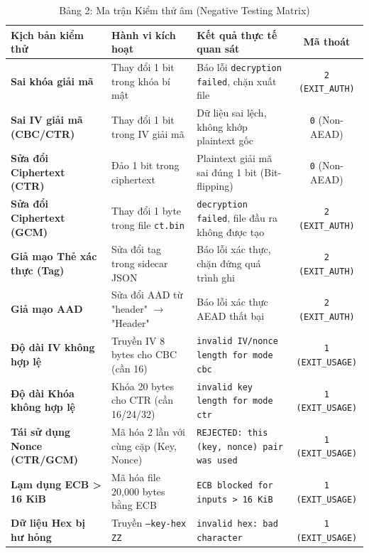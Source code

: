 \documentclass[12pt, a4paper]{report}
\begin{document}
\begin{table}[H]
\centering
\small
\caption{Bảng 2: Ma trận Kiểm thử âm (Negative Testing Matrix)}
\label{tab:negative}
\begin{tabular}{p{4.2cm} p{3.8cm} p{4.2cm} c}
\toprule
\textbf{Kịch bản kiểm thử} & \textbf{Hành vi kích hoạt} & \textbf{Kết quả thực tế quan sát} & \textbf{Mã thoát} \\
\midrule
\textbf{Sai khóa giải mã} & Thay đổi 1 bit trong khóa bí mật & Báo lỗi \texttt{decryption failed}, chặn xuất file & \texttt{2 (EXIT\_AUTH)} \\
\textbf{Sai IV giải mã (CBC/CTR)} & Thay đổi 1 bit trong IV giải mã & Dữ liệu sai lệch, không khớp plaintext gốc & \texttt{0} (Non-AEAD) \\
\textbf{Sửa đổi Ciphertext (CTR)} & Đảo 1 bit trong ciphertext & Plaintext giải mã sai đúng 1 bit (Bit-flipping) & \texttt{0} (Non-AEAD) \\
\textbf{Sửa đổi Ciphertext (GCM)} & Thay đổi 1 byte trong file \texttt{ct.bin} & \texttt{decryption failed}, file đầu ra không được tạo & \texttt{2 (EXIT\_AUTH)} \\
\textbf{Giả mạo Thẻ xác thực (Tag)} & Sửa đổi tag trong sidecar JSON & Báo lỗi xác thực, chặn đứng quá trình ghi & \texttt{2 (EXIT\_AUTH)} \\
\textbf{Giả mạo AAD} & Sửa đổi AAD từ "header" $\rightarrow$ "Header" & Báo lỗi xác thực AEAD thất bại & \texttt{2 (EXIT\_AUTH)} \\
\textbf{Độ dài IV không hợp lệ} & Truyền IV 8 bytes cho CBC (cần 16) & \texttt{invalid IV/nonce length for mode cbc} & \texttt{1 (EXIT\_USAGE)} \\
\textbf{Độ dài Khóa không hợp lệ} & Khóa 20 bytes cho CTR (cần 16/24/32) & \texttt{invalid key length for mode ctr} & \texttt{1 (EXIT\_USAGE)} \\
\textbf{Tái sử dụng Nonce (CTR/GCM)} & Mã hóa 2 lần với cùng cặp (Key, Nonce) & \texttt{REJECTED: this (key, nonce) pair was used} & \texttt{1 (EXIT\_USAGE)} \\
\textbf{Lạm dụng ECB > 16 KiB} & Mã hóa file 20,000 bytes bằng ECB & \texttt{ECB blocked for inputs > 16 KiB} & \texttt{1 (EXIT\_USAGE)} \\
\textbf{Dữ liệu Hex bị hư hỏng} & Truyền \texttt{--key-hex ZZ} & \texttt{invalid hex: bad character} & \texttt{1 (EXIT\_USAGE)} \\
\bottomrule
\end{tabular}
\end{table}
\end{document}
